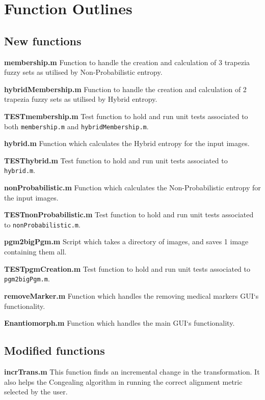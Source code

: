 \chapter{Function Outlines}
\label{appendix:code}

\section{New functions}

\noindent \textbf{membership.m}
Function to handle the creation and calculation of 3 trapezia fuzzy sets as utilised by Non-Probabilistic entropy.

\noindent \textbf{hybridMembership.m}
Function to handle the creation and calculation of 2 trapezia fuzzy sets as utilised by Hybrid entropy.

\noindent \textbf{TESTmembership.m}
Test function to hold and run unit tests associated to both \texttt{membership.m} and \texttt{hybridMembership.m}.

\noindent \textbf{hybrid.m}
Function which calculates the Hybrid entropy for the input images.

\noindent \textbf{TESThybrid.m}
Test function to hold and run unit tests associated to \texttt{hybrid.m}.

\noindent \textbf{nonProbabilistic.m}
Function which calculates the Non-Probabilistic entropy for the input images.

\noindent \textbf{TESTnonProbabilistic.m}
Test function to hold and run unit tests associated to \texttt{nonProbabilistic.m}.

\noindent \textbf{pgm2bigPgm.m}
Script which takes a directory of images, and saves 1 image containing them all.

\noindent \textbf{TESTpgmCreation.m}
Test function to hold and run unit tests associated to \texttt{pgm2bigPgm.m}.

\noindent \textbf{removeMarker.m}
Function which handles the removing medical markers \acrshort{GUI}`s functionality.

\noindent \textbf{Enantiomorph.m}
Function which handles the main \acrshort{GUI}`s functionality.

\section{Modified functions}

\noindent \textbf{incrTrans.m}
This function finds an incremental change in the transformation. It also helps the \Gls{Congealing} algorithm in running the correct alignment metric selected by the user.

